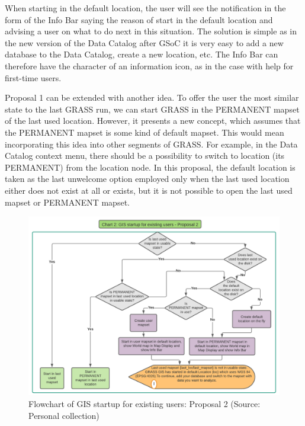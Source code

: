 \documentclass[a4paper,10pt,twoside]{article}
\begin{document}
\newpage
When starting in the default location, the user will see the
notification in the form of the Info Bar saying the reason of start in
the default location and advising a user on what to do next in this
situation. The solution is simple as in the new version of the Data
Catalog after GSoC it is very easy to add a new database to the Data
Catalog, create a new location, etc. The Info Bar can therefore have
the character of an information icon, as in the case with help for
first-time users.

Proposal 1 can be extended with another idea. To offer the user the
most similar state to the last GRASS run, we can start GRASS in the
PERMANENT mapset of the last used location. However, it presents a new
concept, which assumes that the PERMANENT mapset is some kind of
default mapset. This would mean incorporating this idea into other
segments of GRASS. For example, in the Data Catalog context menu,
there should be a possibility to switch to location (its PERMANENT)
from the location node. In this proposal, the default location is
taken as the last unwelcome option employed only when the last used
location either does not exist at all or exists, but it is not
possible to open the last used mapset or PERMANENT mapset.
 
\vspace{0.3cm}
\begin{figure}[hbt!] 
\begin{center}
\includegraphics[width=17cm]{../pictures/normal_user_diagram2.png} 
\caption[Flowchart of GIS startup for existing users: Proposal 2]{Flowchart of GIS startup for existing users: Proposal 2 (Source: Personal collection)}
\label{fig:normal_user_diagram2}
\end{center}
\end{figure}
\end{document}
